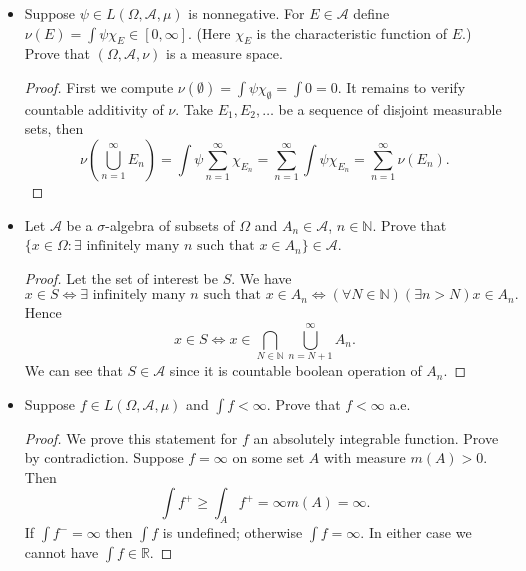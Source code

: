 
\begin{itemize}
	\item Suppose $\psi \in L(\Omega, \mathcal{A}, \mu)$ is nonnegative. For $E \in \mathcal{A}$ define $\nu(E) = \int \psi \chi_E \in [0, \infty ]$. (Here $\chi_E$ is the characteristic function of $E$.) Prove that $(\Omega, \mathcal{A}, \nu)$ is a measure space.
\begin{proof}
	First we compute  $\nu(\emptyset ) = \int \psi \chi_{\emptyset }= \int  0  = 0$. It remains to verify countable additivity of $\nu$. Take $E_1, E_2, \ldots$ be a sequence of disjoint measurable sets, then
	\[
		\nu\left(\bigcup_{n=1 } ^\infty E_n \right) 
		= \int \psi \sum_{n=1}^{\infty} \chi_{E_n}
		= \sum_{n=1}^{\infty}\int \psi  \chi_{E_n}
		= \sum_{n=1}^{\infty} \nu(E_n)
	.\] 
\end{proof}

	\item Let $\mathcal{A}$ be a $\sigma$-algebra of subsets of $\Omega$ and $A_n \in \mathcal{A}$, $n \in \mathbb{N}$. Prove that $\{x \in \Omega: \exists  \text{ infinitely many }n \text{ such that }x \in A_n\} \in \mathcal{A}$.
\begin{proof}
	Let the set of interest be $S$. We have
	\[
		x \in S \iff  \exists  \text{ infinitely many } n \text{ such that }x \in A_n \iff \left( \forall N \in \mathbb{N} \right)  \left( \exists n >N \right)  x \in A_n
	.\] 
	Hence
	\[
		x \in S \iff x \in \bigcap_{N \in \mathbb{N}} \bigcup_{n = N+1}^{\infty } A_n 
	.\] 
	We can see that $S \in \mathcal{A}$  since it is countable boolean operation of $A_n$.
\end{proof}

	\item Suppose $f \in L(\Omega, \mathcal{A}, \mu)$ and $\int f < \infty $. Prove that $f < \infty $ a.e.
\begin{proof}
	We prove this statement for $f$ an absolutely integrable function. Prove by contradiction. Suppose $f = \infty $ on some set $A$ with measure $m(A) > 0$. Then
	\[
		\int  f^+ \ge \int _A f^+ = \infty  m(A) = \infty 
	.\] 
	If $\int f^- = \infty $ then $\int f$ is undefined; otherwise $\int f =\infty $. In either case we cannot have $\int f \in \mathbb{R}$.
\end{proof}


\end{itemize}
